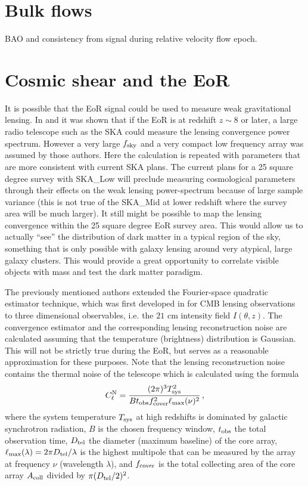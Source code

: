 \documentclass{PoS}
\begin{document}
\section{Bulk flows}

BAO and consistency from signal during relative velocity flow epoch.

\section{Cosmic shear and the EoR}
It is possible that the EoR signal could be used to measure weak gravitational lensing.
In \cite{Zahn:2005ap} and \cite{Metcalf:2009}  it was shown that if the EoR is at redshift 
$z \sim 8$ or later, a large radio telescope such as the SKA could measure the lensing convergence power spectrum.  However a very large $f_{\rm sky}$ and a very compact low frequency array was assumed by those authors.  Here the calculation is repeated with parameters that are more consistent with current SKA plans.  The current plans for a 25 square degree survey with SKA\_Low will preclude measuring cosmological parameters through their effects on the weak lensing power-spectrum because of large sample variance (this is not true of the SKA\_Mid at lower redshift where the survey area will be much larger).  It still might be possible to map the lensing convergence within the 25 square degree EoR survey area.  This would allow us to actually ``see'' the distribution of dark matter in a typical region of the sky, something that is only possible with galaxy lensing around very atypical, large galaxy clusters.  This would provide a great opportunity to correlate visible objects with mass and test the dark matter paradigm.

The previously mentioned authors extended the
Fourier-space quadratic estimator technique, which was first developed in 
\cite{Hu:2001tn} for CMB lensing  observations to three dimensional
observables, i.e. the $21$ cm intensity field $I(\theta,z)$.  
The  convergence
estimator and the corresponding lensing reconstruction noise are
calculated assuming that the temperature (brightness) distribution is
Gaussian. This will not be strictly true during the EoR, but serves as a reasonable approximation for these purposes. Note that the lensing reconstruction noise contains the thermal noise of the telescope which is calculated using the formula
\begin{equation}
C^{\rm N}_\ell = \frac{(2\pi)^3 T^2_{\rm sys}}{B t_{\rm obs} f^2_{\rm cover} \ell_{\rm max}(\nu)^2} \, ,
\end{equation} where the system temperature $T_{\rm sys}$ at high redshifts
 is dominated by galactic synchrotron radiation, $B$ is the chosen frequency window, $t_{\rm obs}$ the total observation time, $D_{\rm tel}$ the diameter (maximum baseline) of the core array, $\ell_{\rm max}(\lambda)=2\pi D_{\rm tel}/\lambda$ is the highest multipole that can be measured by the array at frequency $\nu$ (wavelength $\lambda$), and $f_{\rm cover}$ is the total collecting area of the core array $A_{\rm coll}$ divided by $\pi(D_{\rm tel}/2)^2$. 
 
\end{document}
